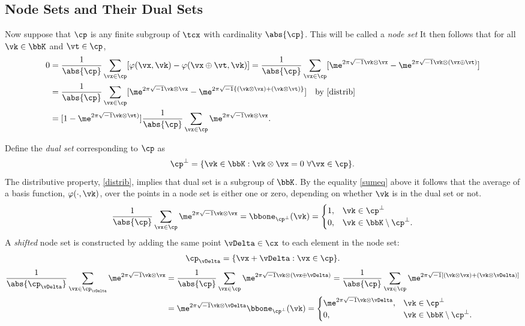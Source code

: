 \documentclass[]{elsarticle}
\begin{document}
\subsection{Node Sets and Their Dual Sets} Now suppose that $\cp$ is any finite subgroup of $\tcx$ with cardinality $\abs{\cp}$.  This will be called a \emph{node set}  It then follows that for all $\vk \in \bbK$ and $\vt \in \cp$,
\begin{align} 
\nonumber
0 & = \frac{1}{\abs{\cp}} \sum_{\vx \in \cp} [\varphi(\vx,\vk) - \varphi(\vx \oplus \vt,\vk)]  = \frac{1}{\abs{\cp}} \sum_{\vx \in \cp} [\me^{2 \pi \sqrt{-1} \vk \otimes \vx} - \me^{2 \pi \sqrt{-1} \vk \otimes (\vx \oplus \vt)}]\\
\nonumber
& = \frac{1}{\abs{\cp}} \sum_{\vx \in \cp} [\me^{2 \pi \sqrt{-1} \vk \otimes \vx} - \me^{2 \pi \sqrt{-1} \{(\vk \otimes \vx) + (\vk \otimes\vt)\}}] \quad \text{by } \eqref{distrib}\\
\label{sumeq}
& = [1 - \me^{2 \pi \sqrt{-1} \vk \otimes\vt)}] \frac{1}{\abs{\cp}} \sum_{\vx \in \cp} \me^{2 \pi \sqrt{-1} \vk \otimes \vx}.
\end{align}

Define the \emph{dual set} corresponding to $\cp$ as  
\begin{equation*}
\cp^{\perp} = \{\vk \in \bbK : \vk \otimes \vx = 0 \ \forall \vx \in \cp\}.
\end{equation*}
The distributive property, \eqref{distrib}, implies that dual set is a subgroup of $\bbK$.  By the equality \eqref{sumeq} above it follows that the average of a basis function, $\varphi(\cdot,\vk)$, over the points in a node set is either one or zero, depending on whether $\vk$ is in the dual set or not.
\begin{equation*}
 \frac{1}{\abs{\cp}} \sum_{\vx \in \cp} \me^{2 \pi \sqrt{-1} \vk \otimes \vx} = \bbone_{\cp^{\perp}}(\vk) = \begin{cases} 1 , & \vk \in \cp^{\perp}\\
 0,  & \vk \in \bbK \setminus \cp^{\perp}.
 \end{cases}
\end{equation*}
A \emph{shifted} node set is constructed by adding the same point $\vDelta \in \cx$ to each element in the node set: 
\begin{equation*}
\cp_{\vDelta} = \{ \vx + \vDelta : \vx \in \cp\}.
\end{equation*}
\begin{align*}
\frac{1}{\abs{\cp_{\vDelta}}} \sum_{\vx \in \cp_{\vDelta}} \me^{2 \pi \sqrt{-1} \vk \otimes \vx} 
& = \frac{1}{\abs{\cp}} \sum_{\vx \in \cp} \me^{2 \pi \sqrt{-1} \vk \otimes (\vx \oplus \vDelta)} = \frac{1}{\abs{\cp}} \sum_{\vx \in \cp} \me^{2 \pi \sqrt{-1} [(\vk \otimes \vx) + (\vk \otimes \vDelta)]}\\
&= \me^{2 \pi \sqrt{-1} \vk \otimes \vDelta} \bbone_{\cp^{\perp}}(\vk) = \begin{cases} \me^{2 \pi \sqrt{-1} \vk \otimes \vDelta} , & \vk \in \cp^{\perp}\\
 0,  & \vk \in \bbK \setminus \cp^{\perp}.
 \end{cases}
\end{align*}
\end{document}
